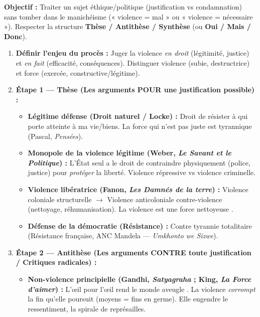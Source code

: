 \documentclass[11pt]{article}
\newcommand{\cle}[1]{{\popxbold\color{popdark}#1}}
\begin{document}
\begin{methode}
\textbf{Objectif :} Traiter un sujet éthique/politique (\cle{justification} vs \cle{condamnation}) sans tomber dans le manichéisme (« violence = mal » ou « violence = nécessaire »). Respecter la structure \textbf{Thèse / Antithèse / Synthèse} (ou \textbf{Oui / Mais / Donc}).
\begin{enumerate}
    \item \textbf{Définir l'enjeu du procès :} Juger la violence \emph{en droit} (légitimité, justice) et \emph{en fait} (efficacité, conséquences). Distinguer \cle{violence} (subie, destructrice) et \cle{force} (exercée, constructive/légitime).
    \item \textbf{Étape 1 — Thèse (Les arguments \textbf{POUR} une justification possible) :}
        \begin{itemize}
            \item \textbf{Légitime défense (Droit naturel / Locke) :} Droit de résister à qui porte atteinte à ma vie/biens. \guillemotleft La force qui n'est pas juste est tyrannique \guillemotright (Pascal, \emph{Pensées}).
            \item \textbf{Monopole de la violence légitime (Weber, \emph{Le Savant et le Politique}) :} L'État seul a le droit de contraindre physiquement (police, justice) pour \emph{protéger} la liberté. Violence \cle{répressive} vs violence \cle{criminelle}.
            \item \textbf{Violence libératrice (Fanon, \emph{Les Damnés de la terre}) :} Violence coloniale structurelle $\rightarrow$ Violence anticoloniale \cle{contre-violence} (nettoyage, réhumanisation). \guillemotleft La violence est une force nettoyeuse \guillemotright.
            \item \textbf{Défense de la démocratie (Résistance) :} Contre tyrannie totalitaire (Résistance française, ANC Mandela — \emph{Umkhonto we Sizwe}).
        \end{itemize}
    \item \textbf{Étape 2 — Antithèse (Les arguments \textbf{CONTRE} toute justification / Critiques radicales) :}
        \begin{itemize}
            \item \textbf{Non-violence principielle (Gandhi, \emph{Satyagraha} ; King, \emph{La Force d'aimer}) :} \guillemotleft L'œil pour l'œil rend le monde aveugle \guillemotright. La violence \emph{corrompt} la fin qu'elle poursuit (moyens = fins en germe). Elle engendre le ressentiment, la spirale de représailles.

\end{itemize}
\end{enumerate}
\end{methode}
\end{document}

